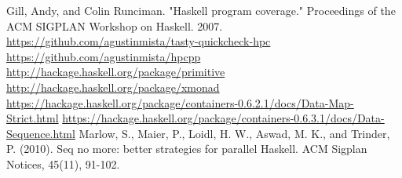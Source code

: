 \documentclass[a4paper,10pt]{article}
\begin{document}

\begin{thebibliography}{}
    Gill, Andy, and Colin Runciman. "Haskell program coverage."
    Proceedings of the ACM SIGPLAN Workshop on Haskell. 2007.
    \url{https://github.com/agustinmista/tasty-quickcheck-hpc}
    \url{https://github.com/agustinmista/hpcpp}
    \url{http://hackage.haskell.org/package/primitive}
    \url{http://hackage.haskell.org/package/xmonad}
    \url{https://hackage.haskell.org/package/containers-0.6.2.1/docs/Data-Map-Strict.html}
    \url{https://hackage.haskell.org/package/containers-0.6.3.1/docs/Data-Sequence.html}
    Marlow, S., Maier, P., Loidl, H. W., Aswad, M. K., and Trinder, P. (2010).
    Seq no more: better strategies for parallel Haskell. ACM Sigplan Notices,
    45(11), 91-102.
\end{thebibliography}
\end{document}
